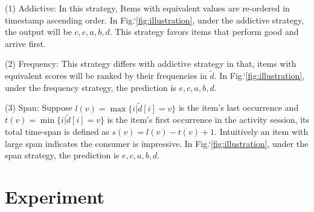 \documentclass[sigconf]{acmart}
\begin{document}
(1) Addictive: In this strategy,  Items with equivalent values are re-ordered in timestamp ascending order. In Fig.`\ref{fig:illustration},  under the addictive strategy, the output will be $c,e,a,b,d$. This strategy favors items that perform good and arrive first.

(2) Frequency: This strategy differs with addictive strategy in that, items with equivalent scores will be ranked by their frequencies in $\tilde{d}$. In Fig.`\ref{fig:illustration},  under the frequency strategy, the prediction is $e,c,a,b,d$.

(3) Span: Suppose $l(v)=\max \{i|\tilde{d}[i]=v\}$ is the item's last occurrence and $t(v)=\min \{i|\tilde{d}[i]=v\} $ is the item's first occurrence in the activity session, its total time-span is defined as $s(v)=l(v)-t(v)+1$. Intuitively an item with large span indicates the  consumer is impressive. In Fig.`\ref{fig:illustration}, under the span strategy, the prediction is $e,c,a,b,d$.


\section{Experiment}\label{sec:experiment}
\end{document}
